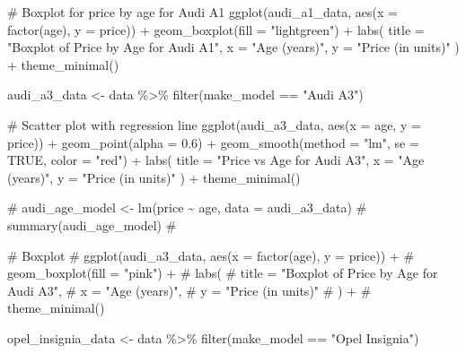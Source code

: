 \documentclass[
  letterpaper,
  DIV=11,
  numbers=noendperiod]{scrartcl}
\newenvironment{Shaded}{\begin{snugshade}}{\end{snugshade}}
\newcommand{\AttributeTok}[1]{\textcolor[rgb]{0.40,0.45,0.13}{#1}}
\newcommand{\CommentTok}[1]{\textcolor[rgb]{0.37,0.37,0.37}{#1}}
\newcommand{\ConstantTok}[1]{\textcolor[rgb]{0.56,0.35,0.01}{#1}}
\newcommand{\FloatTok}[1]{\textcolor[rgb]{0.68,0.00,0.00}{#1}}
\newcommand{\FunctionTok}[1]{\textcolor[rgb]{0.28,0.35,0.67}{#1}}
\newcommand{\NormalTok}[1]{\textcolor[rgb]{0.00,0.23,0.31}{#1}}
\newcommand{\OtherTok}[1]{\textcolor[rgb]{0.00,0.23,0.31}{#1}}
\newcommand{\SpecialCharTok}[1]{\textcolor[rgb]{0.37,0.37,0.37}{#1}}
\newcommand{\StringTok}[1]{\textcolor[rgb]{0.13,0.47,0.30}{#1}}
\begin{document}
\begin{Shaded}
\begin{Highlighting}[]
\CommentTok{\# Boxplot for price by age for Audi A1}
\FunctionTok{ggplot}\NormalTok{(audi\_a1\_data, }\FunctionTok{aes}\NormalTok{(}\AttributeTok{x =} \FunctionTok{factor}\NormalTok{(age), }\AttributeTok{y =}\NormalTok{ price)) }\SpecialCharTok{+}
  \FunctionTok{geom\_boxplot}\NormalTok{(}\AttributeTok{fill =} \StringTok{"lightgreen"}\NormalTok{) }\SpecialCharTok{+}
  \FunctionTok{labs}\NormalTok{(}
    \AttributeTok{title =} \StringTok{"Boxplot of Price by Age for Audi A1"}\NormalTok{,}
    \AttributeTok{x =} \StringTok{"Age (years)"}\NormalTok{,}
    \AttributeTok{y =} \StringTok{"Price (in units)"}
\NormalTok{  ) }\SpecialCharTok{+}
  \FunctionTok{theme\_minimal}\NormalTok{()}
      
\NormalTok{ audi\_a3\_data }\OtherTok{\textless{}{-}}\NormalTok{ data }\SpecialCharTok{\%\textgreater{}\%} \FunctionTok{filter}\NormalTok{(make\_model }\SpecialCharTok{==} \StringTok{"Audi A3"}\NormalTok{)}

\CommentTok{\# Scatter plot with regression line}
\FunctionTok{ggplot}\NormalTok{(audi\_a3\_data, }\FunctionTok{aes}\NormalTok{(}\AttributeTok{x =}\NormalTok{ age, }\AttributeTok{y =}\NormalTok{ price)) }\SpecialCharTok{+}
\FunctionTok{geom\_point}\NormalTok{(}\AttributeTok{alpha =} \FloatTok{0.6}\NormalTok{) }\SpecialCharTok{+}
\FunctionTok{geom\_smooth}\NormalTok{(}\AttributeTok{method =} \StringTok{"lm"}\NormalTok{, }\AttributeTok{se =} \ConstantTok{TRUE}\NormalTok{, }\AttributeTok{color =} \StringTok{"red"}\NormalTok{) }\SpecialCharTok{+}
\FunctionTok{labs}\NormalTok{(}
\AttributeTok{title =} \StringTok{"Price vs Age for Audi A3"}\NormalTok{,}
\AttributeTok{x =} \StringTok{"Age (years)"}\NormalTok{,}
\AttributeTok{y =} \StringTok{"Price (in units)"}
\NormalTok{) }\SpecialCharTok{+}
\FunctionTok{theme\_minimal}\NormalTok{()}

\CommentTok{\# audi\_age\_model \textless{}{-} lm(price \textasciitilde{} age, data = audi\_a3\_data)}
\CommentTok{\# summary(audi\_age\_model)}
\CommentTok{\# }

\CommentTok{\# Boxplot}
\CommentTok{\# ggplot(audi\_a3\_data, aes(x = factor(age), y = price)) +}
\CommentTok{\#   geom\_boxplot(fill = "pink") +}
\CommentTok{\#   labs(}
\CommentTok{\#     title = "Boxplot of Price by Age for Audi A3",}
\CommentTok{\#     x = "Age (years)",}
\CommentTok{\#     y = "Price (in units)"}
\CommentTok{\#   ) +}
\CommentTok{\#   theme\_minimal()}

\NormalTok{opel\_insignia\_data }\OtherTok{\textless{}{-}}\NormalTok{ data }\SpecialCharTok{\%\textgreater{}\%} \FunctionTok{filter}\NormalTok{(make\_model }\SpecialCharTok{==} \StringTok{"Opel Insignia"}\NormalTok{)}


\end{Highlighting}
\end{Shaded}
\end{document}
